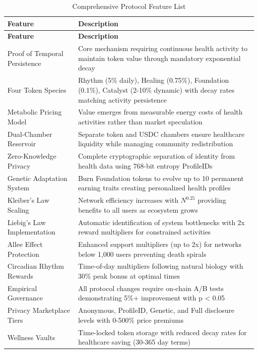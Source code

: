 \documentclass[11pt,letterpaper]{article}
\begin{document}
\begin{longtable}{p{5cm}p{9.5cm}}
\caption{Comprehensive Protocol Feature List} \\
\toprule
\textbf{Feature} & \textbf{Description} \\
\midrule
\endfirsthead
\toprule
\textbf{Feature} & \textbf{Description} \\
\midrule
\endhead
\bottomrule
\endfoot

Proof of Temporal Persistence & Core mechanism requiring continuous health activity to maintain token value through mandatory exponential decay \\
\midrule
Four Token Species & Rhythm (5\% daily), Healing (0.75\%), Foundation (0.1\%), Catalyst (2-10\% dynamic) with decay rates matching activity persistence \\
\midrule
Metabolic Pricing Model & Value emerges from measurable energy costs of health activities rather than market speculation \\
\midrule
Dual-Chamber Reservoir & Separate token and USDC chambers ensure healthcare liquidity while managing community redistribution \\
\midrule
Zero-Knowledge Privacy & Complete cryptographic separation of identity from health data using 768-bit entropy ProfileIDs \\
\midrule
Genetic Adaptation System & Burn Foundation tokens to evolve up to 10 permanent earning traits creating personalized health profiles \\
\midrule
Kleiber's Law Scaling & Network efficiency increases with $N^{0.25}$ providing benefits to all users as ecosystem grows \\
\midrule
Liebig's Law Implementation & Automatic identification of system bottlenecks with 2x reward multipliers for constrained activities \\
\midrule
Allee Effect Protection & Enhanced support multipliers (up to 2x) for networks below 1,000 users preventing death spirals \\
\midrule
Circadian Rhythm Rewards & Time-of-day multipliers following natural biology with 30\% peak bonus at optimal times \\
\midrule
Empirical Governance & All protocol changes require on-chain A/B tests demonstrating 5\%+ improvement with p < 0.05 \\
\midrule
Privacy Marketplace Tiers & Anonymous, ProfileID, Genetic, and Full disclosure levels with 0-500\% price premiums \\
\midrule
Wellness Vaults & Time-locked token storage with reduced decay rates for healthcare saving (30-365 day terms) \\

\end{longtable}
\end{document}
